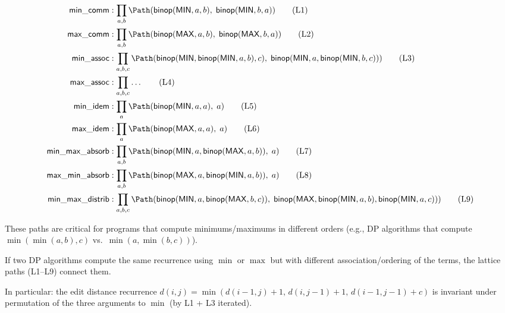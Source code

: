 \begin{definition}
\begin{align}
  \mathsf{min\_comm} &: \prod_{a,b}
    \Path(\mathsf{binop}(\mathsf{MIN}, a, b),\;
          \mathsf{binop}(\mathsf{MIN}, b, a))
    \tag{L1} \\
  \mathsf{max\_comm} &: \prod_{a,b}
    \Path(\mathsf{binop}(\mathsf{MAX}, a, b),\;
          \mathsf{binop}(\mathsf{MAX}, b, a))
    \tag{L2} \\
  \mathsf{min\_assoc} &: \prod_{a,b,c}
    \Path(\mathsf{binop}(\mathsf{MIN},
      \mathsf{binop}(\mathsf{MIN}, a, b), c),\;
      \mathsf{binop}(\mathsf{MIN}, a,
      \mathsf{binop}(\mathsf{MIN}, b, c)))
    \tag{L3} \\
  \mathsf{max\_assoc} &: \prod_{a,b,c} \ldots
    \tag{L4} \\
  \mathsf{min\_idem} &: \prod_a
    \Path(\mathsf{binop}(\mathsf{MIN}, a, a),\; a)
    \tag{L5} \\
  \mathsf{max\_idem} &: \prod_a
    \Path(\mathsf{binop}(\mathsf{MAX}, a, a),\; a)
    \tag{L6} \\
  \mathsf{min\_max\_absorb} &: \prod_{a,b}
    \Path(\mathsf{binop}(\mathsf{MIN}, a,
      \mathsf{binop}(\mathsf{MAX}, a, b)),\; a)
    \tag{L7} \\
  \mathsf{max\_min\_absorb} &: \prod_{a,b}
    \Path(\mathsf{binop}(\mathsf{MAX}, a,
      \mathsf{binop}(\mathsf{MIN}, a, b)),\; a)
    \tag{L8} \\
  \mathsf{min\_max\_distrib} &: \prod_{a,b,c}
    \Path(\mathsf{binop}(\mathsf{MIN}, a,
      \mathsf{binop}(\mathsf{MAX}, b, c)),\;
      \mathsf{binop}(\mathsf{MAX},
        \mathsf{binop}(\mathsf{MIN}, a, b),
        \mathsf{binop}(\mathsf{MIN}, a, c)))
    \tag{L9}
\end{align}
\end{definition}

These paths are critical for programs that compute minimums/maximums
in different orders (e.g., DP algorithms that compute
$\min(\min(a, b), c)$ vs.\ $\min(a, \min(b, c))$).

\begin{theorem}
\label{thm:lattice-dp}
If two DP algorithms compute the same recurrence using $\min$ or
$\max$ but with different association/ordering of the terms, the
lattice paths (L1--L9) connect them.

In particular: the edit distance recurrence
$d(i,j) = \min(d(i{-}1,j)+1,\, d(i,j{-}1)+1,\, d(i{-}1,j{-}1)+c)$
is invariant under permutation of the three arguments to $\min$
(by L1 + L3 iterated).
\end{theorem}


